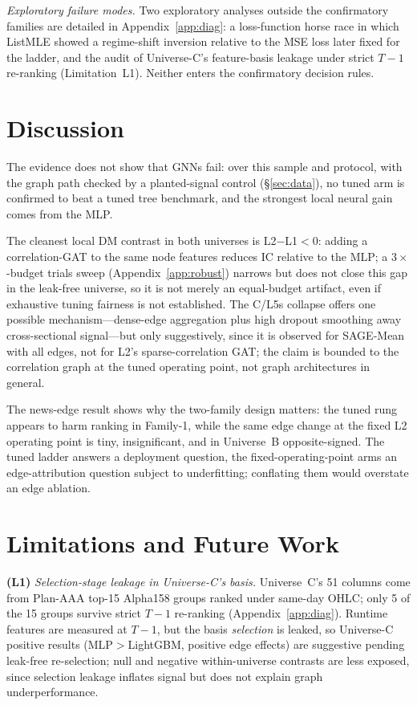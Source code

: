 \documentclass{article}
\begin{document}
\emph{Exploratory failure modes.} Two exploratory analyses outside the confirmatory families are detailed in Appendix~\ref{app:diag}: a loss-function horse race in which ListMLE showed a regime-shift inversion relative to the MSE loss later fixed for the ladder, and the audit of Universe-C's feature-basis leakage under strict $T-1$ re-ranking (Limitation~L1). Neither enters the confirmatory decision rules.

\section{Discussion}\label{sec:discussion}
The evidence does not show that GNNs fail: over this sample and protocol, with the graph path checked by a planted-signal control (\S\ref{sec:data}), no tuned arm is confirmed to beat a tuned tree benchmark, and the strongest local neural gain comes from the MLP.

The cleanest local DM contrast in both universes is L2$-$L1${}<0$: adding a correlation-GAT to the same node features reduces IC relative to the MLP; a $3\times$-budget trials sweep (Appendix~\ref{app:robust}) narrows but does not close this gap in the leak-free universe, so it is not merely an equal-budget artifact, even if exhaustive tuning fairness is not established. The C/L5s collapse offers one possible mechanism---dense-edge aggregation plus high dropout smoothing away cross-sectional signal---but only suggestively, since it is observed for SAGE-Mean with all edges, not for L2's sparse-correlation GAT; the claim is bounded to the correlation graph at the tuned operating point, not graph architectures in general.

The news-edge result shows why the two-family design matters: the tuned rung appears to harm ranking in Family-1, while the same edge change at the fixed L2 operating point is tiny, insignificant, and in Universe~B opposite-signed. The tuned ladder answers a deployment question, the fixed-operating-point arms an edge-attribution question subject to underfitting; conflating them would overstate an edge ablation.

\section{Limitations and Future Work}\label{sec:limits}
\textbf{(L1)} \emph{Selection-stage leakage in Universe-C's basis.} Universe~C's 51 columns come from Plan-AAA top-15 Alpha158 groups ranked under same-day OHLC; only 5 of the 15 groups survive strict $T-1$ re-ranking (Appendix~\ref{app:diag}). Runtime features are measured at $T-1$, but the basis \emph{selection} is leaked, so Universe-C positive results (MLP${}>{}$LightGBM, positive edge effects) are suggestive pending leak-free re-selection; null and negative within-universe contrasts are less exposed, since selection leakage inflates signal but does not explain graph underperformance.
\end{document}

